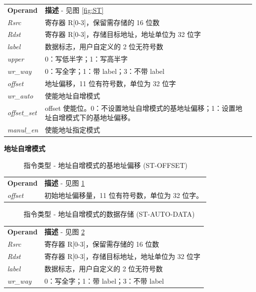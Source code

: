 \documentclass[main\_\_CN.tex]{subfiles}
\begin{document}
\begin{tabular}{ l l }
\textbf{Operand} & \textbf{描述} - 见图 \ref{fig:ST} \\
\textit{Rsrc} & 寄存器 R[0-3]，保留需存储的 16 位数 \\
\textit{Rdst} & 寄存器 R[0-3]，存储目标地址，地址单位为 32 位字\\
\textit{label} & 数据标志，用户自定义的 2 位无符号数\\
\textit{upper} & 0：写低半字；1：写高半字 \\
\textit{wr\_way} & 0：写全字；1：带 label；3：不带 label \\
\textit{offset} & 地址偏移，11 位有符号数，单位为 32 位字\\
\textit{wr\_auto} & 使能地址自增模式 \\
\textit{offset\_set} & offset 使能位。0：不设置地址自增模式的基地址偏移；1：设置地址自增模式下的基地址偏移。\\
\textit{manul\_en} & 使能地址指定模式
\end{tabular}

\textcolor{istcolor}{\textbf{ 地址自增模式}}

%
%
%
%
%
\begin{figure}[H]
    \centering
    \caption{指令类型 - 地址自增模式的基地址偏移 (ST-OFFSET)}
    \label{fig:ST-AUTO-OFFSET}
\end{figure}

\begin{tabular}{ l l }
\textbf{Operand} & \textbf{描述} - 见图 \ref{fig:ST-AUTO-OFFSET} \\
\textit{offset} & 初始地址偏移量，11 位有符号数，单位为 32 位字。 \\
\end{tabular}

%
%
%
%
%
%
%
%
\begin{figure}[H]
    \centering
    \caption{指令类型 - 地址自增模式的数据存储 (ST-AUTO-DATA)}
    \label{fig:ST-AUTO-DATA}
\end{figure}

\begin{tabular}{ l l }
\textbf{Operand} & \textbf{描述} - 见图 \ref{fig:ST-AUTO-DATA} \\
\textit{Rsrc} & 寄存器 R[0-3]，保留需存储的 16 位数 \\
\textit{Rdst} & 寄存器 R[0-3]，存储目标地址，地址单位为 32 位字 \\
\textit{label} & 数据标志，用户自定义的 2 位无符号数 \\
\textit{wr\_way} & 0：写全字；1：带 label；3：不带 label \\
\end{tabular}
\end{document}
